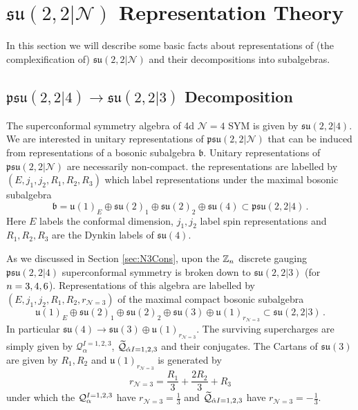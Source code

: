 \documentclass[main.tex]{subfiles}
\begin{document}
\section{\texorpdfstring{$\mathfrak{su}(2,2|\mathcal{N})$}{su(2,2|N)} Representation Theory}\label{sec:su22Nrepn}
In this section we will describe some basic facts about representations of (the complexification of) $\mathfrak{su}(2,2|\mathcal{N})$ and their decompositions into subalgebras. 
\subsection{\texorpdfstring{$\mathfrak{psu}(2,2|4)\to\mathfrak{su}(2,2|3)$}{psu(2,2|4)-> su(2,2|3)} Decomposition}
The superconformal symmetry algebra of 4d $\mathcal{N}=4$ SYM  is given by $\mathfrak{su}(2,2|4)$. We are interested in unitary representations of $\mathfrak{psu}(2,2|\mathcal{N})$ that can be induced from representations of a bosonic subalgebra $\mathfrak{b}$. Unitary representations of $\mathfrak{psu}(2,2|\mathcal{N})$ are necessarily non-compact. the representations are labelled by $(E,j_1,j_2,R_1,R_2,R_3)$ which label representations under the maximal bosonic subalgebra
\begin{equation}
\mathfrak{b}=\mathfrak{u}(1)_E\oplus\mathfrak{su}(2)_1\oplus \mathfrak{su}(2)_2\oplus \mathfrak{su}(4) \subset \mathfrak{psu}(2,2|4)\,.
\end{equation}
Here $E$ labels the conformal dimension, $j_1,j_2$ label spin representations and \newline$R_1,R_2,R_3$ are the Dynkin labels of $\mathfrak{su}(4)$. 

As we discussed in Section \ref{sec:N3Cons}, upon the $\mathbb{Z}_{n}$ discrete gauging $\mathfrak{psu}(2,2|4)$ superconformal symmetry is broken down to $\mathfrak{su}(2,2|3)$ (for ${n}=3,4,6$). Representations of this algebra are labelled by $(E,j_1,j_2,R_1,R_2,r_{\mathcal{N}=3})$ of the maximal compact bosonic subalgebra
\begin{equation}
\mathfrak{u}(1)_E\oplus\mathfrak{su}(2)_1\oplus \mathfrak{su}(2)_2\oplus \mathfrak{su}(3)\oplus\mathfrak{u}(1)_{r_{\mathcal{N}=3}} \subset \mathfrak{su}(2,2|3)\,.
\end{equation}
In particular $\mathfrak{su}(4)\to \mathfrak{su}(3)\oplus \mathfrak{u}(1)_{r_{\mathcal{N}=3}}$.
The surviving supercharges are simply given by $\mathcal{Q}_{\alpha}^{I=1,2,3}$, $\widetilde{\mathcal{Q}}_{\dot\alpha I=1,2,3}$ and their conjugates. The Cartans of $\mathfrak{su}(3)$ are given by $R_1,R_2$ and $\mathfrak{u}(1)_{r_{\mathcal{N}=3}}$ is generated by 
\begin{equation}
r_{\mathcal{N}=3}=\frac{R_1}{3}+\frac{2R_2}{3}+R_3
\end{equation}
under which the $\mathcal{Q}_{\alpha}^{I=1,2,3}$ have $r_{\mathcal{N}=3}=\frac{1}{3}$ and $\widetilde{\mathcal{Q}}_{\dot\alpha I=1,2,3}$ have $r_{\mathcal{N}=3}=-\frac{1}{3}$. 
\end{document}
